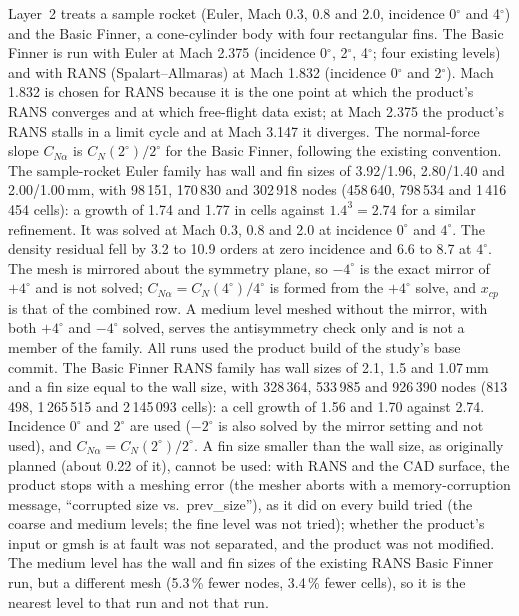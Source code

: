 \documentclass[11pt,a4paper]{article}
\newcommand{\CNa}{C_{N\alpha}}
\begin{document}
Layer~2 treats a sample rocket (Euler, Mach 0.3, 0.8 and 2.0, incidence 0$^\circ$ and 4$^\circ$) and the
Basic Finner, a cone-cylinder body with four rectangular fins.
The Basic Finner is run with Euler at Mach 2.375 (incidence 0$^\circ$, 2$^\circ$, 4$^\circ$; four existing
levels) and with RANS (Spalart--Allmaras) at Mach 1.832 (incidence 0$^\circ$ and 2$^\circ$).
Mach 1.832 is chosen for RANS because it is the one point at which the product's RANS converges and at which
free-flight data exist; at Mach 2.375 the product's RANS stalls in a limit cycle and at Mach 3.147 it diverges.
The normal-force slope $\CNa$ is $C_N(2^\circ)/2^\circ$ for the Basic Finner, following the existing convention.
The sample-rocket Euler family has wall and fin sizes of 3.92/1.96, 2.80/1.40 and 2.00/1.00\,mm, with 98\,151, 170\,830 and 302\,918
nodes (458\,640, 798\,534 and 1\,416\,454 cells): a growth of 1.74 and 1.77 in cells against $1.4^3=2.74$ for a similar refinement.
It was solved at Mach 0.3, 0.8 and 2.0 at incidence $0^\circ$ and $4^\circ$.
The density residual fell by 3.2 to 10.9 orders at zero incidence and 6.6 to 8.7 at $4^\circ$.
The mesh is mirrored about the symmetry plane, so $-4^\circ$ is the exact mirror of $+4^\circ$ and is not solved;
$\CNa=C_N(4^\circ)/4^\circ$ is formed from the $+4^\circ$ solve, and $x_{cp}$ is that of the combined row.
A medium level meshed without the mirror, with both $+4^\circ$ and $-4^\circ$ solved, serves the antisymmetry check only and is not a member of the family.
All runs used the product build of the study's base commit.
The Basic Finner RANS family has wall sizes of 2.1, 1.5 and 1.07\,mm and a fin size equal to the wall size, with 328\,364, 533\,985 and
926\,390 nodes (813\,498, 1\,265\,515 and 2\,145\,093 cells): a cell growth of 1.56 and 1.70 against 2.74.
Incidence $0^\circ$ and $2^\circ$ are used ($-2^\circ$ is also solved by the mirror setting and not used), and $\CNa=C_N(2^\circ)/2^\circ$.
A fin size smaller than the wall size, as originally planned (about 0.22 of it), cannot be used: with RANS and the CAD surface, the product stops with a
meshing error (the mesher aborts with a memory-corruption message, ``corrupted size vs.\ prev\_size''), as it did on every build tried (the coarse and medium levels; the fine level was not tried); whether the product's input or gmsh is at fault was not separated, and the product was not modified.
The medium level has the wall and fin sizes of the existing RANS Basic Finner run, but a different mesh (5.3\,\% fewer nodes, 3.4\,\% fewer cells),
so it is the nearest level to that run and not that run.
\end{document}
